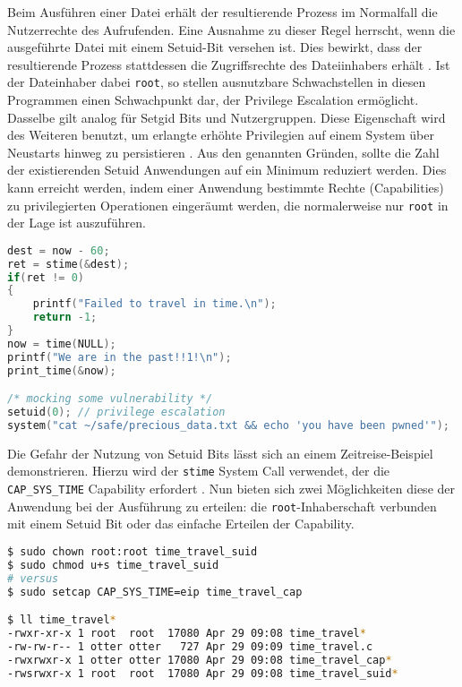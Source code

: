 Beim Ausführen einer Datei erhält der resultierende Prozess im Normalfall die Nutzerrechte des Aufrufenden. Eine Ausnahme zu dieser Regel herrscht, wenn die ausgeführte Datei mit einem Setuid-Bit versehen ist. Dies bewirkt, dass der resultierende Prozess stattdessen die Zugriffsrechte des Dateiinhabers erhält \cite{man-chmod}. Ist der Dateinhaber dabei \texttt{root}, so stellen ausnutzbare Schwachstellen in diesen Programmen einen Schwachpunkt dar, der Privilege Escalation ermöglicht. Dasselbe gilt analog für Setgid
Bits und Nutzergruppen. Diese Eigenschaft wird des Weiteren benutzt, um erlangte erhöhte Privilegien auf einem System über Neustarts hinweg zu persistieren \cite{attack-setuid}. Aus den genannten Gründen, sollte die Zahl der existierenden Setuid Anwendungen auf ein Minimum reduziert werden. Dies kann erreicht werden, indem einer Anwendung bestimmte Rechte (Capabilities) zu privilegierten Operationen eingeräumt werden, die normalerweise nur \texttt{root} in der Lage ist
auszuführen. 

\begin{lstlisting}[language=c,label=lst:timetravel]
dest = now - 60;
ret = stime(&dest);
if(ret != 0)
{
    printf("Failed to travel in time.\n");
    return -1;
}
now = time(NULL);
printf("We are in the past!!1!\n");
print_time(&now);

/* mocking some vulnerability */
setuid(0); // privilege escalation
system("cat ~/safe/precious_data.txt && echo 'you have been pwned'");
\end{lstlisting}

Die Gefahr der Nutzung von Setuid Bits lässt sich an einem Zeitreise-Beispiel demonstrieren. Hierzu wird der \texttt{stime} System Call verwendet, der die \texttt{CAP\_SYS\_TIME} Capability erfordert \cite{man-capabilities}. Nun bieten sich zwei Möglichkeiten diese der Anwendung bei der Ausführung zu erteilen: die \texttt{root}-Inhaberschaft verbunden mit einem Setuid Bit oder das einfache Erteilen der Capability.


\begin{lstlisting}[language=bash]
$ sudo chown root:root time_travel_suid
$ sudo chmod u+s time_travel_suid 
# versus
$ sudo setcap CAP_SYS_TIME=eip time_travel_cap

$ ll time_travel*
-rwxr-xr-x 1 root  root  17080 Apr 29 09:08 time_travel*
-rw-rw-r-- 1 otter otter   727 Apr 29 09:09 time_travel.c
-rwxrwxr-x 1 otter otter 17080 Apr 29 09:08 time_travel_cap*
-rwsrwxr-x 1 root  root  17080 Apr 29 09:08 time_travel_suid*
\end{lstlisting}

